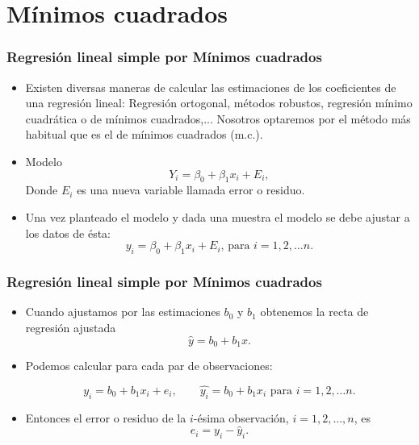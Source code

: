 \section{Mínimos cuadrados}
\begin{frame}
\frametitle{Regresión lineal simple por Mínimos cuadrados}

\begin{block}{}
\begin{itemize}
\item<2->{Existen diversas maneras de calcular las estimaciones de  los
coeficientes de una regresión lineal: Regresión ortogonal, métodos
robustos, regresión mínimo cuadrática o de mínimos cuadrados,...
Nosotros optaremos por el método más habitual que es el de mínimos
cuadrados (m.c.).}
\item<3->{Modelo
$$Y_i=\beta_0+\beta_1 x_i+ E_i,$$
Donde $E_i$ es una nueva variable llamada error o residuo.}
\item<4->{Una vez planteado el modelo  y dada una muestra el modelo se debe
ajustar a los datos de ésta:
$$y_i=\beta_0+\beta_1 x_i+ E_i,\, \mbox{para } i=1,2,\ldots n.$$}
\end{itemize}
\end{block}
\end{frame}

\begin{frame}
\frametitle{Regresión lineal simple por Mínimos cuadrados}

\begin{itemize}
\item<2->{Cuando ajustamos por las estimaciones $b_0$ y $b_1$
obtenemos la recta de regresión ajustada
$$\hat{y}=b_0+b_1 x.$$}

\item<3->{Podemos calcular para cada par de observaciones:

$$y_i= b_0+b_1 x_i+e_i,\qquad \hat{y_i}=b_0+b_1 x_i \mbox{ para } i=1,2,\ldots n.$$}
\item<4->{Entonces el error o residuo de la $i$-ésima observación,
$i=1,2,\ldots,n$, es
$$e_i=y_i-\hat{y}_i.$$}
\end{itemize}
\end{frame}

